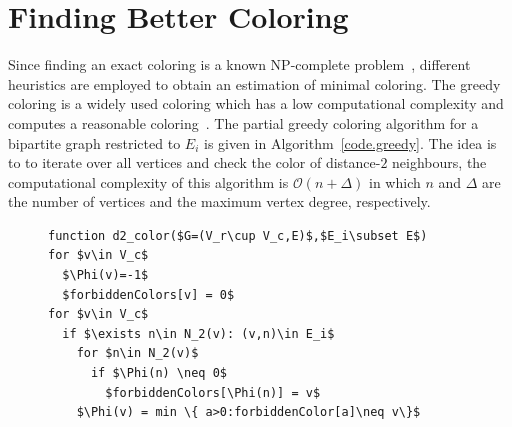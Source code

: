 \documentclass[11pt, twoside,a4paper]{book}
\newcommand{\coderef}[1]{Algorithm~\protect\ref{#1}}
\begin{document}
\section{Finding Better Coloring}
\label{s.better.coloring}
Since finding an exact coloring is a known NP-complete problem~\cite{SPINRAD198589},
different heuristics are employed to obtain an estimation of minimal coloring.
The greedy coloring is a widely used coloring which has a low computational complexity
and computes a reasonable coloring~\cite{spaa14}.
The partial greedy coloring algorithm for a bipartite graph restricted to $E_i$
is given in \coderef{code.greedy}. The idea is to to iterate over all vertices
and check the color of distance-$2$ neighbours, the computational complexity
of this algorithm is $\mathcal{O}(n + \Delta)$ in which $n$
and $\Delta$ are the number of vertices and the maximum vertex
degree, respectively.

\begin{figure}
\begin{lstlisting}[caption=The greedy algorithm for
the distance-$2$ coloring for columns in which $N_2(v)$ shows
the distance-$2$ neighbours of $v$.
,label=code.greedy,mathescape]
function d2_color($G=(V_r\cup V_c,E)$,$E_i\subset E$)
for $v\in V_c$
  $\Phi(v)=-1$
  $forbiddenColors[v] = 0$
for $v\in V_c$
  if $\exists n\in N_2(v): (v,n)\in E_i$
    for $n\in N_2(v)$
      if $\Phi(n) \neq 0$
        $forbiddenColors[\Phi(n)] = v$
    $\Phi(v) = min \{ a>0:forbiddenColor[a]\neq v\}$
\end{lstlisting}
\end{figure}
\end{document}

